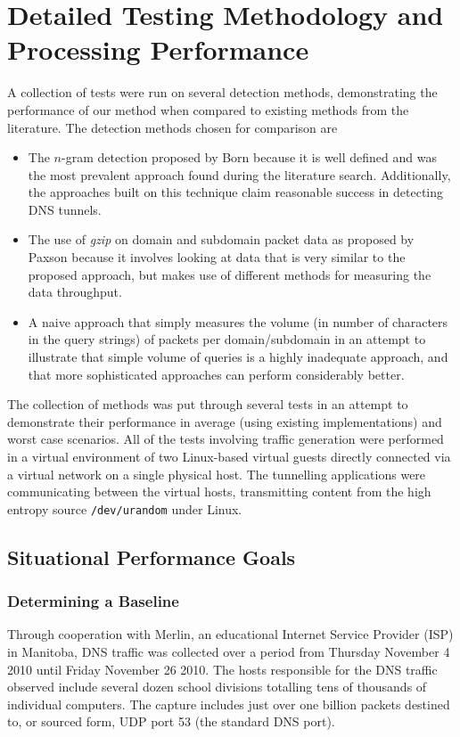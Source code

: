 \documentclass{llncs}
\begin{document}
\section{Detailed Testing Methodology and Processing Performance}
A collection of tests were run on several detection methods, demonstrating the
performance of our method when compared to existing methods
from the literature. The detection methods chosen for comparison are

\label{chosen-methods}
\begin{itemize}

\item The $n$-gram detection proposed by Born\cite{Born2010.cfa} because it is
well defined and was the most prevalent approach found during the literature
search. Additionally, the approaches built on this technique claim reasonable
success in detecting DNS tunnels.

\item The use of \emph{gzip} on domain and subdomain packet data as proposed by
Paxson\cite{Paxson2011} because it involves looking at data that is very similar
to the proposed approach, but makes use of
different methods for measuring the data throughput.

\item A naive approach that simply measures the volume (in number of characters
in the query strings) of packets per domain/subdomain in an attempt to
illustrate that simple volume of queries is a highly inadequate approach, and
that more sophisticated approaches can perform considerably better.
\end{itemize}

The collection of methods was put through several tests in an attempt to
demonstrate their performance in average (using existing implementations) and
worst case scenarios. All of the tests involving traffic generation were
performed in a virtual environment of two Linux-based virtual guests directly
connected via a virtual network on a single physical host. The tunnelling
applications were communicating between the virtual hosts, transmitting content
from the high entropy source \texttt{/dev/urandom} under Linux.

\subsection{Situational Performance Goals}
\subsubsection{Determining a Baseline}
\label{baseline}
Through cooperation with Merlin, an educational Internet Service Provider (ISP)
in Manitoba, DNS traffic was collected over a period from Thursday November 4
2010 until Friday November 26 2010. The hosts responsible for the DNS traffic
observed include several dozen school divisions totalling tens of thousands of
individual computers. The capture includes just over one billion packets
destined to, or sourced form, UDP port 53 (the standard DNS port).
\end{document}
